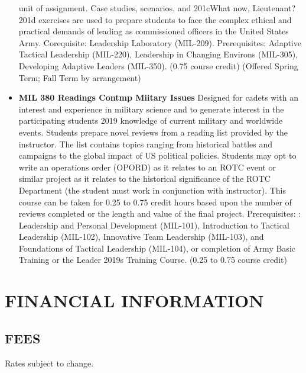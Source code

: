 \documentclass[
  letterpaper,
]{scrbook}
\renewcommand{\part}[1]{\addcontentsline{toc}{part}{#1}}
\begin{document}
\begin{itemize}
  unit of assignment. Case studies, scenarios, and 201cWhat now,
  Lieutenant? 201d exercises are used to prepare students to face the
  complex ethical and practical demands of leading as commissioned
  officers in the United States Army. Corequisite: Leadership Laboratory
  (MIL-209). Prerequisites: Adaptive Tactical Leadership (MIL-220),
  Leadership in Changing Environs (MIL-305), Developing Adaptive Leaders
  (MIL-350). (0.75 course credit) (Offered Spring Term; Fall Term by
  arrangement)
\item
  \textbf{MIL 380 Readings Contmp Miitary Issues} Designed for cadets
  with an interest and experience in military science and to generate
  interest in the participating students 2019 knowledge of current
  military and worldwide events. Students prepare novel reviews from a
  reading list provided by the instructor. The list contains topics
  ranging from historical battles and campaigns to the global impact of
  US political policies. Students may opt to write an operations order
  (OPORD) as it relates to an ROTC event or similar project as it
  relates to the historical significance of the ROTC Department (the
  student must work in conjunction with instructor). This course can be
  taken for 0.25 to 0.75 credit hours based upon the number of reviews
  completed or the length and value of the final project. Prerequisites:
  : Leadership and Personal Development (MIL-101), Introduction to
  Tactical Leadership (MIL-102), Innovative Team Leadership (MIL-103),
  and Foundations of Tactical Leadership (MIL-104), or completion of
  Army Basic Training or the Leader 2019s Training Course. (0.25 to 0.75
  course credit)
\end{itemize}

\part{FINANCIAL RESOURCES}

\hypertarget{financial-information}{%
\chapter{FINANCIAL INFORMATION}\label{financial-information}}

\hypertarget{fees}{%
\section{FEES}\label{fees}}

Rates subject to change.
\end{document}
